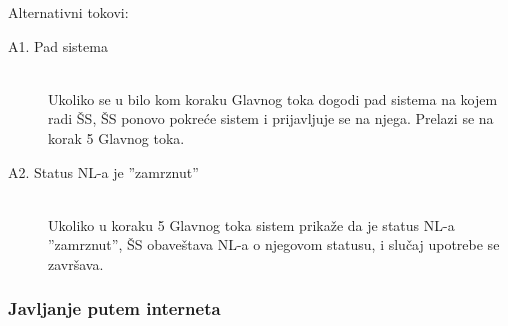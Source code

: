 \noindent Alternativni tokovi: 
\begin{description}
	\item[A1. Pad sistema] ~\\
	Ukoliko se u bilo kom koraku Glavnog toka dogodi pad sistema na kojem radi \v SS, \v SS ponovo pokre\'ce sistem i prijavljuje se na njega. Prelazi se na korak 5 Glavnog toka.
	
	\item[A2. Status NL-a je ''zamrznut''] ~\\
	Ukoliko u koraku 5 Glavnog toka sistem prika\v ze da je status NL-a ''zamrznut'', \v SS obave\v stava NL-a o njegovom statusu, i slu\v caj upotrebe se zavr\v sava.
\end{description}

\subsubsection{Javljanje putem interneta}
\label{su: javljanje putem interneta}

